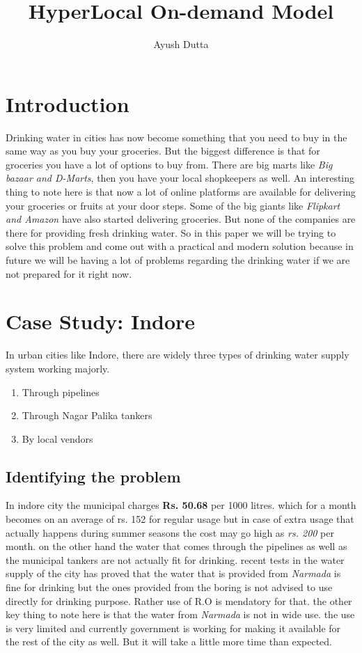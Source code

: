 \documentclass[a4paper, 12pt]{article}
\title{HyperLocal On-demand Model }
\author{Ayush Dutta}
\begin{document}
\maketitle

\section{Introduction}
Drinking water in cities has now become something that you need to buy in the same way as you buy your groceries. But the biggest difference is that for groceries you have a lot of options to buy from. There are big marts like
\textit{Big bazaar and D-Marts}, 
then you have your local shopkeepers as well. An interesting thing to note here is that now a lot of online platforms are available for delivering your groceries or fruits at your door steps. Some of the big giants like
\textit{Flipkart and Amazon} 
have also started delivering groceries. But none of the companies are there for providing fresh drinking water. So in this paper we will be trying to solve this problem and come out with a practical and modern solution because in future we will be having a lot of problems regarding the drinking water if we are not prepared for it right now.

\section{Case Study: Indore}
In urban cities like Indore, there are widely three types of drinking water supply system working majorly.
\begin{enumerate}
    \item Through pipelines
    \item Through Nagar Palika tankers
    \item By local vendors
\end{enumerate}

\subsection[short]{Identifying the problem}
In indore city the municipal charges \textbf{Rs. 50.68} per 1000 litres. which for a month becomes on an average of rs. 152 for regular usage but in case of extra usage 
that actually happens during summer seasons the cost may go high as \textit{rs. 200} per month. on the other hand the water that comes through the pipelines as well as 
the municipal tankers are not actually fit for drinking. recent tests in the water supply of the city has proved that the water that is provided from \textit{Narmada} is 
fine for drinking but the ones provided from the boring is not advised to use directly for drinking purpose. Rather use of R.O is mendatory for that. the other key thing 
to note here is that the water from \textit{Narmada} is not in wide use. the use is very limited and currently government is working for making it available for the rest
of the city as well. But it will take a little more time than expected. 
\end{document}
